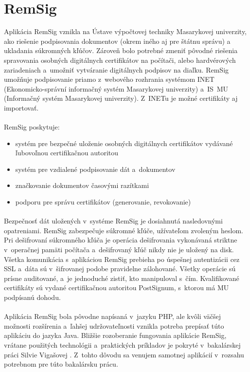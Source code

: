\documentclass[
  printed, %
  table,   %
oneside,
  nolof,     %
  nolot,     %
]{fithesis3}
\begin{document}
\section{RemSig}
Aplikácia RemSig \cite{remsigMuni} vznikla na Ústave výpočtovej techniky Masarykovej univerzity, ako riešenie podpisovania dokumentov (okrem iného aj pre štátnu správu) a ukladania súkromných kľúčov. Zároveň bolo potrebné zmeniť pôvodné riešenia spravovania osobných digitálnych certifikátov na počítači, alebo hardvérových zariadeniach a~umožniť vytváranie digitálnych podpisov na diaľku. RemSig umožňuje podpisovanie priamo z~webového rozhrania systémom INET (Ekonomicko-správní informačný systém Masarykovej univerzity) a~IS~MU (Informačný systém Masarykovej univerzity). Z~INETu je možné certifikáty aj importovať.\paragraph{}
RemSig poskytuje:
\begin{itemize}
\item systém pre bezpečné uloženie osobných digitálnych certifikátov vydávané ľubovoľnou certifikačnou autoritou
\item systém pre vzdialené podpisovanie dát a~dokumentov
\item značkovanie dokumentov časovými razítkami 
\item podporu pre správu certifikátov (generovanie, revokovanie)

 \end{itemize}

\paragraph{}
Bezpečnosť dát uložených v~systéme RemSig je dosiahnutá nasledovnými opatreniami. RemSig zabezpečuje súkromné kľúče, užívateľom zvoleným heslom. Pri dešifrovaní súkromného kľúča je operácia dešifrovania vykonávaná striktne v~operačnej pamäti počítača a~dešifrovaný kľúč nikdy nie je uložený na disk. Všetka komunikácia s~aplikáciou RemSig prebieha po úspešnej autentizácii cez SSL a~dáta sú v~šifrovanej podobe pravidelne zálohované. Všetky operácie sú prísne auditované, a~je jednoduché zistiť, kto manipuloval s~čím. Kvalifikované certifikáty sú vydané certifikačnou autoritou PostSignum, s~ktorou má MU podpísanú dohodu.
\paragraph{}
Aplikácia RemSig bola pôvodne napísaná v~jazyku PHP, ale kvôli väčšej možnosti rozšírenia a~ľahšej udržovateľnosti \cite{javaVsPHP} vznikla potreba prepísať túto aplikáciu do jazyka Java.  Bližšie rozoberanie fungovania aplikácie RemSig, vrátane použitých technológii a~praktických príkladov je pokryté v~bakalárskej práci Silvie Vigašovej \cite{remsigSilvia}. Z~tohto dôvodu sa venujem samotnej aplikácií  v~rozsahu potrebnom pre túto bakalársku prácu. 
\end{document}
